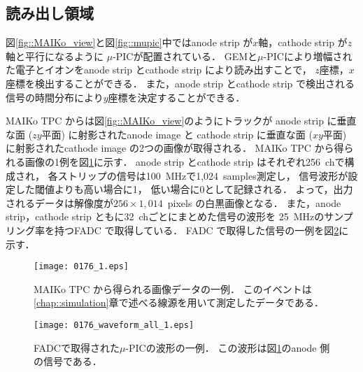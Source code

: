 \documentclass[../master]{subfiles}
\begin{document}
\subsection{読み出し領域}
\label{sec::mu-pic}
図\ref{fig::MAIKo_view}と図\ref{fig::mupic}中ではanode strip が$x$軸，cathode strip が$z$軸と平行になるように
$\mu$-PICが配置されている．
GEMと$\mu$-PICにより増幅された電子とイオンをanode strip とcathode strip により読み出すことで，
$z$座標，$x$座標を検出することができる．
また，anode strip とcathode strip で検出される信号の時間分布により$y$座標を決定することができる．

MAIKo TPC からは図\ref{fig::MAIKo_view}のようにトラックが
anode strip に垂直な面 ($zy$平面) に射影されたanode image と
cathode strip に垂直な面 ($xy$平面) に射影されたcathode image の2つの画像が取得される．
MAIKo TPC から得られる画像の1例を図\ref{fig::track_demo}に示す．
anode strip とcathode strip はそれぞれ256~chで構成され，
各ストリップの信号は\SI{100}{\mega\hertz}で1,024~samples測定し，
信号波形が設定した閾値よりも高い場合に1，
低い場合に0として記録される．
よって，出力されるデータは解像度が$256\times1,014$~pixels の白黒画像となる．
また，anode strip，cathode strip ともに32~chごとにまとめた信号の波形を
\SI{25}{\mega\hertz}のサンプリング率を持つFADC で取得している．
FADC で取得した信号の一例を図\ref{fig::FADC_waveform}に示す．
\begin{figure}
  \centering
  \texttt{[image: 0176\_1.eps]}
  \caption[MAIKo TPC から得られる画像データの一例．]
          {MAIKo TPC から得られる画像データの一例．
          このイベントは\ref{chap::simulation}章で述べる線源を用いて測定したデータである．}
  \label{fig::track_demo}
\end{figure}
\begin{figure}
  \centering
  \texttt{[image: 0176\_waveform\_all\_1.eps]}
  \caption[FADCで取得された$\mu$-PICの波形の一例．]
          {FADCで取得された$\mu$-PICの波形の一例．
          この波形は図\ref{fig::track_demo}のanode 側の信号である．}
  \label{fig::FADC_waveform}
\end{figure}
\end{document}

